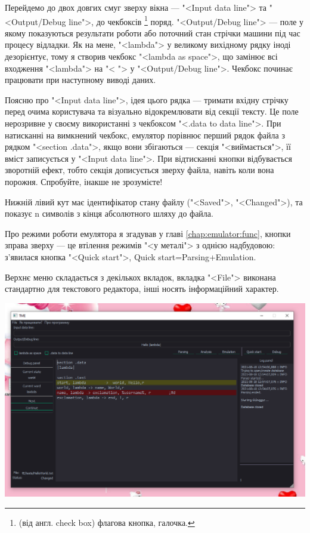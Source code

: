 \documentclass[oneside,final,14pt]{extreport}
\newenvironment{changemargin}[2]{%
\begin{list}{}{%
\setlength{\topsep}{0pt}%
\setlength{\leftmargin}{#1}%
\setlength{\rightmargin}{#2}%
\setlength{\listparindent}{\parindent}%
\setlength{\itemindent}{\parindent}%
\setlength{\parsep}{\parskip}%
}%
\item[]}{\end{list}}
\begin{document}
Перейдемо до двох довгих смуг зверху вікна ---  "<Input data line"> та "<Output/Debug line">, до чекбоксів
\footnote{(від англ. check box) флагова кнопка, галочка.}
поряд. "<Output/Debug line"> --- поле у якому показуються результати роботи або поточний стан стрічки машини під час процесу відладки. Як на мене, "<lambda"> у великому вихідному рядку іноді дезорієнтує, тому я створив  чекбокс "<lambda as space">, що замінює всі входження "<lambda"> на "< "> у "<Output/Debug line">. Чекбокс починає працювати при наступному виводі даних.

Поясню про "<Input data line">, ідея цього рядка --- тримати вхідну стрічку перед очима користувача та візуально відокремлювати від секції тексту. Це поле нерозривне у своєму використанні з чекбоксом "<.data to data line">. При натисканні на вимкнений чекбокс, емулятор порівнює перший рядок файла з рядком "<section .data">, якщо вони збігаються --- секція "<виймається">, її вміст записується у "<Input data line">. При відтисканні кнопки відбувається зворотній ефект, тобто секція дописується зверху файла, навіть коли вона порожня. Спробуйте, інакше не зрозумієте!

Нижній лівий кут має ідентифікатор стану файлу ("<Saved">, "<Changed">), та показує n символів з кінця абсолютного шляху до файла.

Про режими роботи емулятора я згадував у главі
\ref{chap:emulator:func}, кнопки зправа зверху --- це втілення режимів "<у металі"> з однією надбудовою: з'явилася кнопка "<Quick start">, Quick start=Parsing+Emulation.

Верхнє меню складається з декількох вкладок, вкладка "<File"> виконана стандартно для текстового редактора, інші носять інформаційний характер.

\begin{changemargin}{-10,3cm}{1,1cm}
\begin{landscape}
\includegraphics[scale=0.94]{1}
\label{screenshot}
\end{landscape}
\end{changemargin}
\end{document}
